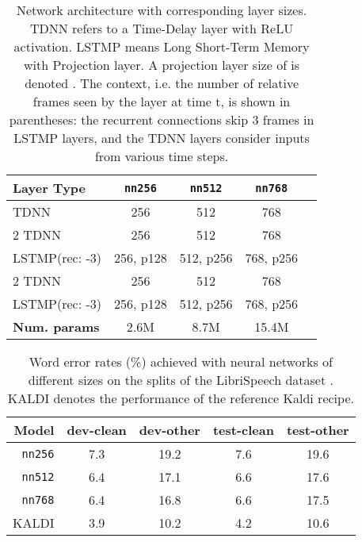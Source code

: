 \documentclass{article}
\begin{document}
  \begin{table}
\begin{center}
      \begin{tabular}{lcccc}
        \textbf{Layer Type} & \texttt{nn256} & \texttt{nn512} & \texttt{nn768} \\\hline
        TDNN  & 256 & 512 & 768 \\
        2  TDNN & 256 & 512 & 768 \\
        
        LSTMP(rec: -3) &  256, p128 &  512, p256 &  768, p256 \\
        2  TDNN & 256 & 512 & 768 \\
        
        LSTMP(rec: -3) & 256, p128 & 512, p256 & 768, p256 \\\hline
        \textbf{Num. params} & 2.6M & 8.7M & 15.4M \\\hline
      \end{tabular}
    \end{center}
    \caption{Network architecture with corresponding layer sizes. TDNN refers to a Time-Delay layer with ReLU activation. LSTMP means Long Short-Term Memory with Projection layer. A projection layer size of  is denoted . The context, i.e. the number of relative frames seen by the layer at time t, is shown in parentheses: the recurrent connections skip 3 frames in LSTMP layers, and the TDNN layers consider inputs from various time steps.}
\label{sec:BLO}
  \end{table}

  \begin{table}
\label{tab:net-size}
    \begin{center}
      \begin{tabular}{rcccc}
        \textbf{Model} & \textbf{dev-clean} & \textbf{dev-other} & \textbf{test-clean} & \textbf{test-other} \\
        \hline
        \texttt{nn256} & 7.3 & 19.2 & 7.6 & 19.6 \\
        \texttt{nn512} & 6.4 & 17.1 & 6.6 & 17.6 \\
        \texttt{nn768} & 6.4 & 16.8 & 6.6 & 17.5 \\\hline
                KALDI     & 3.9 & 10.2 & 4.2 & 10.6 \\\hline
      \end{tabular}
    \vspace{0.1cm}
    \caption{Word error rates (\%) achieved with neural networks of different sizes on the splits of the LibriSpeech dataset \cite{panayotov2015librispeech}. KALDI denotes the performance of the reference Kaldi recipe.}
    \end{center}
  \end{table}
\end{document}
